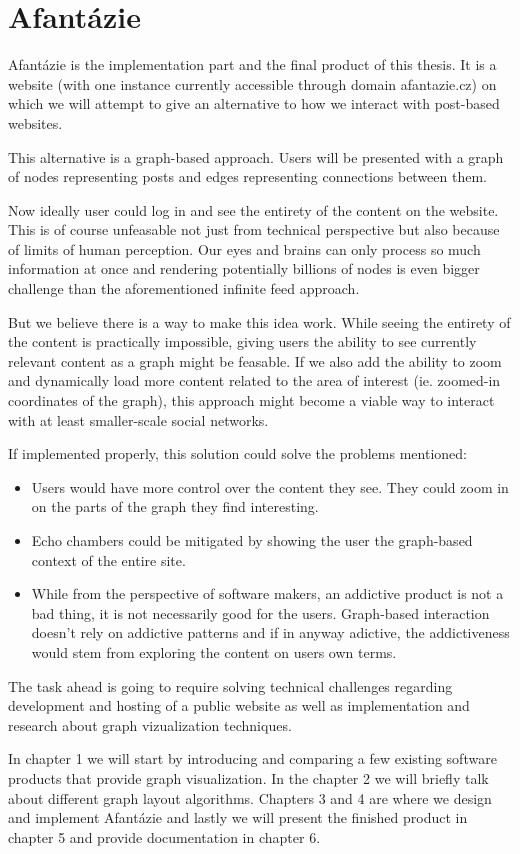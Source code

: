 \section*{Afantázie}
Afantázie is the implementation part and the final product of this thesis.
It is a website (with one instance currently accessible through domain afantazie.cz)
on which we will attempt to give an alternative to how we interact with post-based websites.

This alternative is a graph-based approach.
Users will be presented with a graph of nodes representing posts and edges representing connections between them.

Now ideally user could log in and see the entirety of the content on the website.
This is of course unfeasable not just from technical perspective but also because of limits of human perception.
Our eyes and brains can only process so much information at once
and rendering potentially billions of nodes is even bigger challenge than the aforementioned infinite feed approach.

But we believe there is a way to make this idea work.
While seeing the entirety of the content is practically impossible,
giving users the ability to see currently relevant content as a graph might be feasable.
If we also add the ability to zoom and dynamically load more content related to the area of interest (ie. zoomed-in coordinates of the graph),
this approach might become a viable way to interact with at least smaller-scale social networks.

If implemented properly, this solution could solve the problems mentioned:
\begin{itemize}
  \item Users would have more control over the content they see. They could zoom in on the parts of the graph they find interesting.
  \item Echo chambers could be mitigated by showing the user the graph-based context of the entire site.
  \item While from the perspective of software makers, an addictive product is not a bad thing, it is not necessarily good for the users.
    Graph-based interaction doesn't rely on addictive patterns and if in anyway adictive,
    the addictiveness would stem from exploring the content on users own terms.
\end{itemize}



The task ahead is going to require solving technical challenges regarding development and hosting of a public website
as well as implementation and research about graph vizualization techniques.

In chapter 1 we will start by introducing and comparing a few existing software products that provide graph visualization.
In the chapter 2 we will briefly talk about different graph layout algorithms.
Chapters 3 and 4 are where we design and implement Afantázie
and lastly we will present the finished product in chapter 5 and provide documentation in chapter 6.